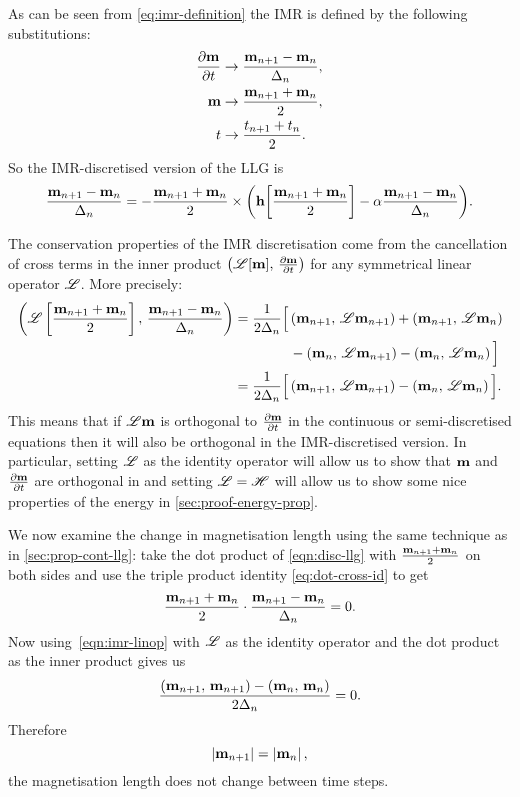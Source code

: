 As can be seen from \cref{eq:imr-definition} the IMR is defined by the following substitutions:
\begin{equation}
\begin{aligned}
  \label{eq:55}
  \pd{\mv}{t} &\rightarrow \frac{\mv_{n+1} - \mv_n}{\dtn}, \\
  \mv &\rightarrow \frac{\mv_{n+1} + \mv_n}{2}, \\
  t &\rightarrow \frac{t_{n+1} + t_n}{2}.
\end{aligned}
\end{equation}
So the IMR-discretised version of the LLG is
\begin{equation}
  \frac{\mv_{n+1} - \mv_n}{\dtn} = - \frac{\mv_{n+1} + \mv_n}{2} \times
  \bigb{\hv \bigs{\frac{\mv_{n+1} + \mv_n}{2}} - \dampc \frac{\mv_{n+1} - \mv_n}{\dtn}}.
  \label{eqn:disc-llg}
\end{equation}

The conservation properties of the IMR discretisation come from the cancellation of cross terms in the inner product $\left(\mathscr{L}[\boldsymbol{\mathrm{m}}],\, \frac{\partial \boldsymbol{\mathrm{m}}}{\partial t} \right)$ for any symmetrical linear operator $\mathscr{L}$.
More precisely:
\begin{equation}
  \begin{aligned}
    \label{eqn:imr-linop}
    \ip{\lop \left[ \frac{\mv_{n+1} + \mv_n}{2} \right]}{ \frac{\mv_{n+1} - \mv_n}{\dtn} }
    &= \frac{1}{2\dtn} \Big[
    \ip{\mv_{n+1}}{\lop \mv_{n+1}} + \ip{\mv_{n+1}}{\lop \mv_{n}} \\
    & \qquad\qquad - \ip{\mv_{n}}{\lop \mv_{n+1}} - \ip{\mv_{n}}{\lop \mv_{n}}
    \Big] \\
    &= \frac{1}{2\dtn} \Big[
    \ip{\mv_{n+1}}{\lop \mv_{n+1}}
    - \ip{\mv_{n}}{\lop \mv_{n}}
    \Big].
  \end{aligned}
\end{equation}
This means that if $\mathscr{L} \boldsymbol{\mathrm{m}}$ is orthogonal to $\frac{\partial \boldsymbol{\mathrm{m}}}{\partial t}$ in the continuous or semi-discretised equations then it will also be orthogonal in the IMR-discretised version.
In particular, setting $\mathscr{L}$ as the identity operator will allow us to show that $\boldsymbol{\mathrm{m}}$ and $\frac{\partial \boldsymbol{\mathrm{m}}}{\partial t}$ are orthogonal in  and setting $\mathscr{L} = \mathscr{H}$ will allow us to show some nice properties of the energy in \cref{sec:proof-energy-prop}.

We now examine the change in magnetisation length using the same technique as in \cref{sec:prop-cont-llg}: take the dot product of \cref{eqn:disc-llg} with $\frac{\boldsymbol{\mathrm{m}}_{n+1} + \boldsymbol{\mathrm{m}}_n}{2}$ on both sides and use the triple product identity \cref{eq:dot-cross-id} to get
\begin{equation}
  \label{eq:63}
  \frac{\mv_{n+1} + \mv_n}{2} \cdot \frac{\mv_{n+1} - \mv_n}{\dtn} = 0.
\end{equation}
Now using~\cref{eqn:imr-linop} with $\mathscr{L}$ as the identity operator and the dot product as the inner product gives us
\begin{equation}
  \frac{\left(\boldsymbol{\mathrm{m}}_{n+1},\, \boldsymbol{\mathrm{m}}_{n+1} \right) - \left(\boldsymbol{\mathrm{m}}_n,\, \boldsymbol{\mathrm{m}}_n \right) }{2 \Delta_{n}} = 0.
\end{equation}
Therefore
\begin{equation}
  \left|{\boldsymbol{\mathrm{m}}_{n+1}} \right| = \left|{\boldsymbol{\mathrm{m}}_n} \right|,
\end{equation}
\ie the magnetisation length does not change between time steps.

